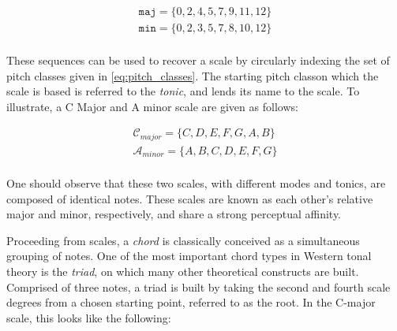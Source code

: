\begin{align*}
\texttt{maj} = \{0, 2, 4, 5, 7, 9, 11, 12\} \\
\texttt{min} = \{0, 2, 3, 5, 7, 8, 10, 12\} \\
\end{align*}

These sequences can be used to recover a scale by circularly indexing the set of pitch classes given in \ref{eq:pitch_classes}.
The starting pitch classon which the scale is based is referred to the \emph{tonic}, and lends its name to the scale.
To illustrate, a C Major and A minor scale are given as follows:

\begin{align*}
\mathcal{C}_{major} = \{C, D, E, F, G, A, B\} \\
\mathcal{A}_{minor} = \{A, B, C, D, E, F, G\} \\
\end{align*}

One should observe that these two scales, with different modes and tonics, are composed of identical notes.
These scales are known as each other's relative major and minor, respectively, and share a strong perceptual affinity.



Proceeding from scales, a \emph{chord} is classically conceived as a simultaneous grouping of notes.
One of the most important chord types in Western tonal theory is the \emph{triad}, on which many other theoretical constructs are built.
Comprised of three notes, a triad is built by taking the second and fourth scale degrees from a chosen starting point, referred to as the root.
In the C-major scale, this looks like the following:

